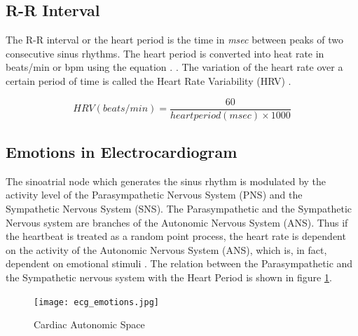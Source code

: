 \subsection{R-R Interval}
\label{sec:rrinterval}
The R-R interval or the heart period is the time in \textit{msec} between peaks of two consecutive sinus rhythms. The heart period is converted into heat rate in beats/min or bpm using the equation . \cite{cacioppo_cardiovascular_2016_p_183_216}. The variation of the heart rate over a certain period of time is called the Heart Rate Variability (HRV) \cite{noauthor_what_2017}.

\begin{equation}
\label{eq:hrv}
    HRV(beats/min) = \frac{60}{heart period (msec) \times 1000}
\end{equation}

\subsection{Emotions in Electrocardiogram}
The sinoatrial node which generates the sinus rhythm is modulated by the activity level of the Parasympathetic Nervous System (PNS) and the Sympathetic Nervous System (SNS). The Parasympathetic and the Sympathetic Nervous system are branches of the Autonomic Nervous System (ANS). Thus if the heartbeat is treated as a random point process, the heart rate is dependent on the activity of the Autonomic Nervous System (ANS), which is, in fact, dependent on emotional stimuli \cite{kim_emotion_2004}. The relation between the Parasympathetic and the Sympathetic nervous system with the Heart Period is shown in figure \ref{fig:ecg_emotions}.

\begin{figure}
    \centering
    \texttt{[image: ecg\_emotions.jpg]}
    \caption{Cardiac Autonomic Space \cite{cacioppo_cardiovascular_2016_p_183_216}}
    \label{fig:ecg_emotions}
\end{figure}

